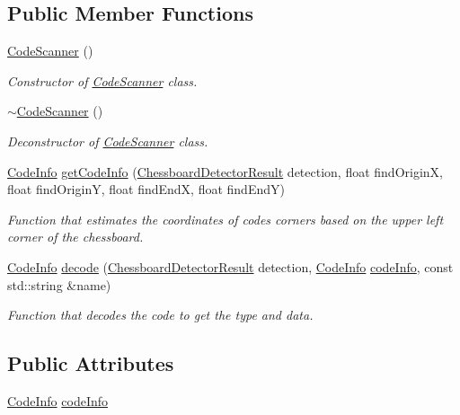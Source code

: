 \subsection*{Public Member Functions}
\begin{DoxyCompactItemize}
\item 
\hyperlink{class_code_scanner_a3bcd2d58ba99d3489a82c39a7982d13b}{Code\+Scanner} ()
\begin{DoxyCompactList}\small\item\em Constructor of \hyperlink{class_code_scanner}{Code\+Scanner} class. \end{DoxyCompactList}\item 
\hyperlink{class_code_scanner_a092360e7816a81de90384495bd0f3e44}{$\sim$\+Code\+Scanner} ()
\begin{DoxyCompactList}\small\item\em Deconstructor of \hyperlink{class_code_scanner}{Code\+Scanner} class. \end{DoxyCompactList}\item 
\hyperlink{struct_code_info}{Code\+Info} \hyperlink{class_code_scanner_a8ed0db374175da430110411dac1ceba1}{get\+Code\+Info} (\hyperlink{struct_chessboard_detector_result}{Chessboard\+Detector\+Result} detection, float find\+OriginX, float find\+OriginY, float find\+EndX, float find\+EndY)
\begin{DoxyCompactList}\small\item\em Function that estimates the coordinates of code\textquotesingle{}s corners based on the upper left corner of the chessboard. \end{DoxyCompactList}\item 
\hyperlink{struct_code_info}{Code\+Info} \hyperlink{class_code_scanner_a9660d74f2750b274d92396be1cd63ab4}{decode} (\hyperlink{struct_chessboard_detector_result}{Chessboard\+Detector\+Result} detection, \hyperlink{struct_code_info}{Code\+Info} \hyperlink{class_code_scanner_a7f6371a29a0d630c9508c070f8c8966f}{code\+Info}, const std\+::string \&name)
\begin{DoxyCompactList}\small\item\em Function that decodes the code to get the type and data. \end{DoxyCompactList}\end{DoxyCompactItemize}
\subsection*{Public Attributes}
\begin{DoxyCompactItemize}
\item 
\hyperlink{struct_code_info}{Code\+Info} \hyperlink{class_code_scanner_a7f6371a29a0d630c9508c070f8c8966f}{code\+Info}
\end{DoxyCompactItemize}


